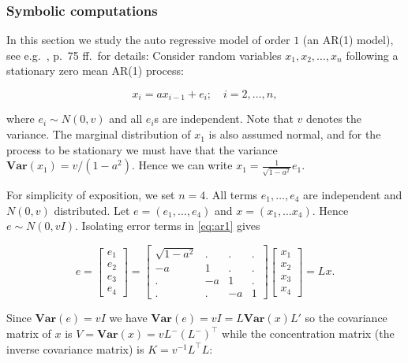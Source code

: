 \hypertarget{symbolic-computations}{%
\subsubsection{Symbolic computations}\label{symbolic-computations}}

In this section we study the auto regressive model of order \(1\) (an AR(1) model), see
e.g.~\cite{shumway:etal:16}, p.~75 ff.~for details:
Consider random variables \(x_1, x_2, \dots, x_n\) following a stationary zero mean AR(1) process:

\begin{equation}
  x_i = a x_{i-1} + e_i; \quad i=2, \dots, n,
  \label{eq:ar1}
\end{equation}

where \(e_i \sim N(0, v)\) and all \(e_i\)s are independent. Note that \(v\) denotes the variance.
The marginal distribution of \(x_1\) is also assumed normal, and for the process to be stationary
we must have that the variance \(\mathbf{Var}(x_1) = v / (1-a^2)\).
Hence we can write \(x_1 = \frac 1 {\sqrt{1-a^2}} e_1\).

For simplicity of exposition, we set \(n=4\). All terms \(e_1, \dots, e_4\) are independent and \(N(0, v)\) distributed. Let \(e=(e_1, \dots, e_4)\) and \(x=(x_1, \dots x_4)\). Hence \(e \sim N(0, v I)\). Isolating
error terms in \eqref{eq:ar1} gives

\[
  e= \left[\begin{matrix}e_{1}\\e_{2}\\e_{3}\\e_{4}\end{matrix}\right] = \left[\begin{matrix}\sqrt{1 - a^{2}} & . & . & .\\- a & 1 & . & .\\. & - a & 1 & .\\. & . & - a & 1\end{matrix}\right] \left[\begin{matrix}x_{1}\\x_{2}\\x_{3}\\x_{4}\end{matrix}\right] = L x  .
\]

Since
\(\mathbf{Var}(e)=v I\) we have \(\mathbf{Var}(e)=v I=L \mathbf{Var}(x) L'\) so the covariance matrix of \(x\) is \(V=\mathbf{Var}(x) = v L^- (L^-)^\top\) while the concentration matrix (the inverse covariance
matrix) is \(K=v^{-1}L^\top L\):

